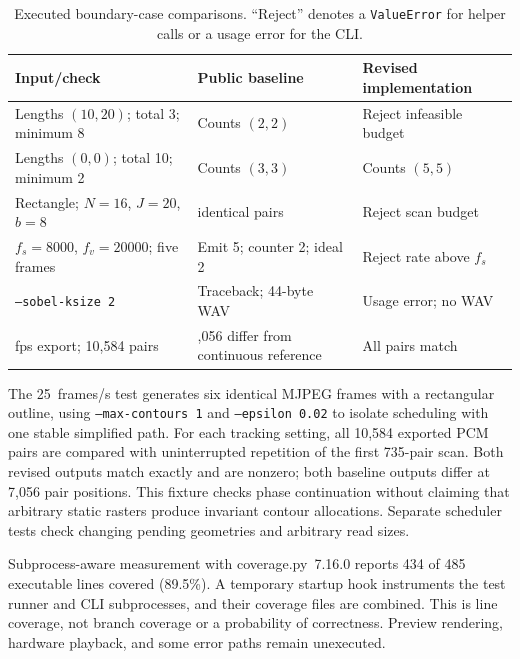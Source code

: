 \documentclass[11pt,a4paper]{article}
\newcommand{\code}[1]{\texttt{#1}}
\begin{document}
\begin{table}[htbp]
\centering\small
\caption{Executed boundary-case comparisons. ``Reject'' denotes a \code{ValueError} for helper calls or a usage error for the CLI.}
\label{tab:regressions}
\begin{tabular}{@{}>{\raggedright\arraybackslash}p{.43\linewidth}>{\raggedright\arraybackslash}p{.25\linewidth}>{\raggedright\arraybackslash}p{.25\linewidth}@{}}
\toprule
Input/check & Public baseline & Revised implementation\\\midrule
Lengths $(10,20)$; total 3; minimum 8 & Counts $(2,2)$ & Reject infeasible budget\\
Lengths $(0,0)$; total 10; minimum 2 & Counts $(3,3)$ & Counts $(5,5)$\\
Rectangle; $N=16$, $J=20$, $b=8$ & 16 identical pairs & Reject scan budget\\
$f_s=8000$, $f_v=20000$; five frames & Emit 5; counter 2; ideal 2 & Reject rate above $f_s$\\
\code{--sobel-ksize 2} & Traceback; 44-byte WAV & Usage error; no WAV\\
25 fps export; 10,584 pairs & 7,056 differ from continuous reference & All pairs match\\\bottomrule
\end{tabular}
\end{table}

The 25~frames/s test generates six identical MJPEG frames with a rectangular outline, using \code{--max-contours 1} and \code{--epsilon 0.02} to isolate scheduling with one stable simplified path. For each tracking setting, all 10,584 exported PCM pairs are compared with uninterrupted repetition of the first 735-pair scan. Both revised outputs match exactly and are nonzero; both baseline outputs differ at 7,056 pair positions. This fixture checks phase continuation without claiming that arbitrary static rasters produce invariant contour allocations. Separate scheduler tests check changing pending geometries and arbitrary read sizes.

Subprocess-aware measurement with coverage.py~7.16.0 reports 434 of 485 executable lines covered (89.5\%). A temporary startup hook instruments the test runner and CLI subprocesses, and their coverage files are combined. This is line coverage, not branch coverage or a probability of correctness. Preview rendering, hardware playback, and some error paths remain unexecuted.
\end{document}
